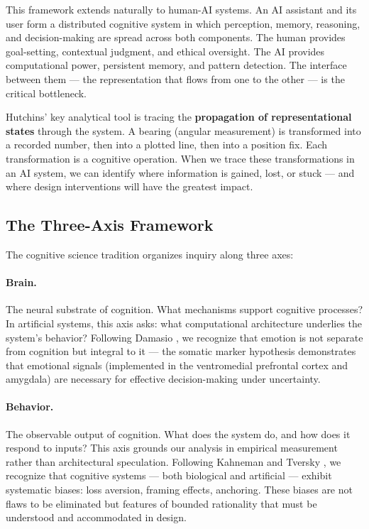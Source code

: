 \documentclass[11pt,a4paper]{article}
\begin{document}
This framework extends naturally to human-AI systems. An AI assistant and its user form a distributed cognitive system in which perception, memory, reasoning, and decision-making are spread across both components. The human provides goal-setting, contextual judgment, and ethical oversight. The AI provides computational power, persistent memory, and pattern detection. The interface between them --- the representation that flows from one to the other --- is the critical bottleneck.

Hutchins' key analytical tool is tracing the \textbf{propagation of representational states} through the system. A bearing (angular measurement) is transformed into a recorded number, then into a plotted line, then into a position fix. Each transformation is a cognitive operation. When we trace these transformations in an AI system, we can identify where information is gained, lost, or stuck --- and where design interventions will have the greatest impact.

\subsection{The Three-Axis Framework}

The cognitive science tradition organizes inquiry along three axes:

\paragraph{Brain.} The neural substrate of cognition. What mechanisms support cognitive processes? In artificial systems, this axis asks: what computational architecture underlies the system's behavior? Following Damasio \citep{damasio1994}, we recognize that emotion is not separate from cognition but integral to it --- the somatic marker hypothesis demonstrates that emotional signals (implemented in the ventromedial prefrontal cortex and amygdala) are necessary for effective decision-making under uncertainty.

\paragraph{Behavior.} The observable output of cognition. What does the system do, and how does it respond to inputs? This axis grounds our analysis in empirical measurement rather than architectural speculation. Following Kahneman and Tversky \citep{kahneman1979}, we recognize that cognitive systems --- both biological and artificial --- exhibit systematic biases: loss aversion, framing effects, anchoring. These biases are not flaws to be eliminated but features of bounded rationality that must be understood and accommodated in design.
\end{document}
